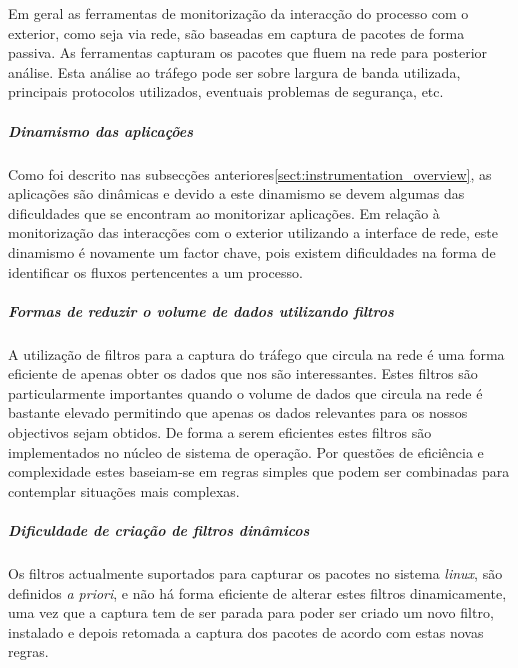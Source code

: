 % 
% 
% 

Em geral as ferramentas de monitorização da interacção do processo com o exterior, como seja via rede, são baseadas em captura de pacotes de forma passiva.
As ferramentas capturam os pacotes que fluem na rede para posterior análise.
Esta análise ao tráfego pode ser sobre largura de banda utilizada, principais protocolos utilizados, eventuais problemas de segurança, etc.

\subparagraph*{Dinamismo das aplicações}
Como foi descrito nas subsecções anteriores\ref{sect:instrumentation_overview}, as aplicações são dinâmicas e devido a este dinamismo se devem algumas das dificuldades que se encontram ao monitorizar aplicações.
Em relação à monitorização das interacções com o exterior utilizando a interface de rede, este dinamismo é novamente um factor chave, pois existem dificuldades na forma de identificar os fluxos pertencentes a um processo.

\subparagraph*{Formas de reduzir o volume de dados utilizando filtros}
A utilização de filtros para a captura do tráfego que circula na rede é uma forma eficiente de apenas obter os dados que nos são interessantes.
Estes filtros são particularmente importantes quando o volume de dados que circula na rede é bastante elevado permitindo que apenas os dados relevantes para os nossos objectivos sejam obtidos.
De forma a serem eficientes estes filtros são implementados no núcleo de sistema de operação.
Por questões de eficiência e complexidade estes baseiam-se em regras simples que podem ser combinadas para contemplar situações mais complexas.

\subparagraph*{Dificuldade de criação de filtros dinâmicos}
Os filtros actualmente suportados para capturar os pacotes no sistema \textit{linux}, são definidos \textit{a priori}, e não há forma eficiente de alterar estes filtros dinamicamente, uma vez que a captura tem de ser parada para poder ser criado um novo filtro, instalado e depois retomada a captura dos pacotes de acordo com estas novas regras.

